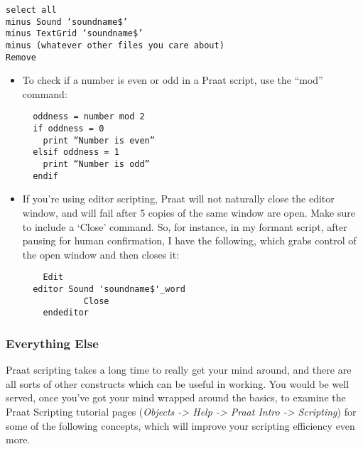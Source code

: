 \begin{verbatim} 
select all
minus Sound ‘soundname$’
minus TextGrid ‘soundname$’
minus (whatever other files you care about)
Remove
\end{verbatim}

\begin{itemize}
\tightlist
\item
  To check if a number is even or odd in a Praat script, use the ``mod''
  command:

  \begin{verbatim}
  oddness = number mod 2
  if oddness = 0
    print “Number is even”
  elsif oddness = 1
    print “Number is odd”
  endif
  \end{verbatim}
\item
  If you're using editor scripting, Praat will not naturally close the
  editor window, and will fail after 5 copies of the same window are
  open. Make sure to include a `Close' command. So, for instance, in my
  formant script, after pausing for human confirmation, I have the
  following, which grabs control of the open window and then closes
  it:\\

  \begin{verbatim}
    Edit
  editor Sound 'soundname$'_word
            Close
    endeditor
  \end{verbatim}
\end{itemize}

\hypertarget{everything-else}{%
\subsubsection{Everything Else}\label{everything-else}}

Praat scripting takes a long time to really get your mind around, and
there are all sorts of other constructs which can be useful in working.
You would be well served, once you've got your mind wrapped around the
basics, to examine the Praat Scripting tutorial pages (\emph{Objects
-\textgreater{} Help -\textgreater{} Praat Intro -\textgreater{}
Scripting}) for some of the following concepts, which will improve your
scripting efficiency even more.

